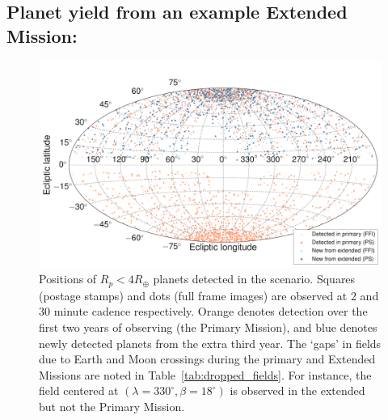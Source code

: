 \subsection{Planet yield from an example Extended Mission: {\rm \nhemi}}
\label{sec:results_from_nhemi_extended_mission}

\begin{figure}[t]
	\centering
	\includegraphics[]{figures/skymap_dropped_fields.pdf}
	\caption{Positions of $R_p<4R_\oplus$ planets detected in the \nhemi\:scenario. Squares (postage stamps) and dots (full frame images) are observed at 2 and 30 minute cadence respectively. Orange denotes detection over the first two years of observing (the Primary Mission), and blue denotes newly detected planets from the extra third year. The `gaps' in fields due to Earth and Moon crossings during the primary and Extended Missions are noted in Table~\protect\ref{tab:dropped_fields}. For instance, the field centered at $(\lambda=330^\circ,\beta=18^\circ)$ is observed in the extended but not the Primary Mission. }
	\label{fig:skymap_nhemi}
\end{figure}
